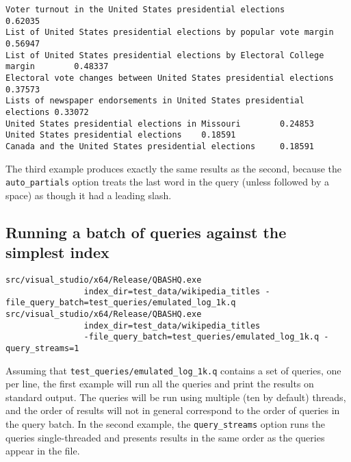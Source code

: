 \documentclass{article}
\begin{document}
{\footnotesize
\begin{verbatim}Voter turnout in the United States presidential elections       0.62035
List of United States presidential elections by popular vote margin     0.56947
List of United States presidential elections by Electoral College margin        0.48337
Electoral vote changes between United States presidential elections     0.37573
Lists of newspaper endorsements in United States presidential elections 0.33072
United States presidential elections in Missouri        0.24853
United States presidential elections    0.18591
Canada and the United States presidential elections     0.18591

\end{verbatim}
}

\noindent The third example produces exactly the same results as the second,
because the \texttt{auto\_partials} option treats the last word in the
query (unless followed by a space) as though it had a leading slash.


\subsection{Running a batch of queries against the simplest index}
{\footnotesize
\begin{verbatim}
src/visual_studio/x64/Release/QBASHQ.exe
                index_dir=test_data/wikipedia_titles -file_query_batch=test_queries/emulated_log_1k.q 
src/visual_studio/x64/Release/QBASHQ.exe
                index_dir=test_data/wikipedia_titles
                -file_query_batch=test_queries/emulated_log_1k.q -query_streams=1
\end{verbatim}
}

Assuming that \texttt{test\_queries/emulated\_log\_1k.q} contains a
set of queries, one per line, the first example will run all the
queries and print the results on standard output.   The queries will
be run using multiple (ten by default) threads, and the order of
results will not in general correspond to the order of queries in the
query batch.   In the second example, the \texttt{query\_streams}
option runs the queries single-threaded and presents results in the
same order as the queries appear in the file.
\end{document}
